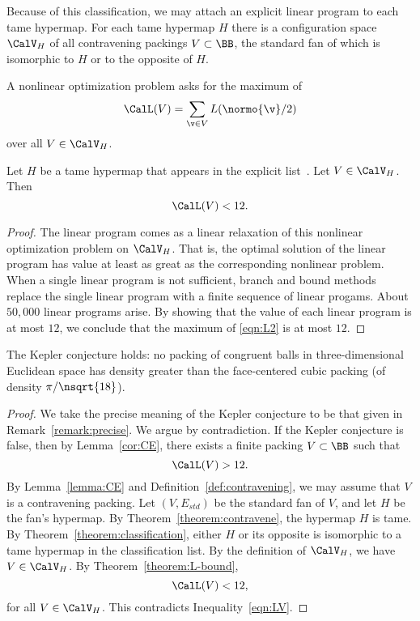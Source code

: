 Because of this classification, we may attach an explicit linear
program to each tame hypermap.  For each tame hypermap $H$ there is a
configuration space $\CalV_H$ of all contravening packings $V\subset
\BB$, the standard fan of which is isomorphic to $H$ or to the
opposite of $H$.  
%
%

A nonlinear optimization problem asks for the maximum of
\begin{equation}\label{eqn:L2}
\CalL(V)=\sum_{\v\in V} L(\normo{\v}/2)
\end{equation}
over all $V\in \CalV_H$.

\begin{theorem}\label{theorem:L-bound}  
Let $H$ be a tame hypermap that appears in the
explicit list~\cite{website:FlyspeckProject}.  Let $V\in \CalV_H$.  Then
\[
\CalL(V) < 12.
\]
\end{theorem}
%

\begin{proof}
  The linear program comes as a linear relaxation of this nonlinear
  optimization problem on $\CalV_H$. That is, the optimal solution of
  the linear program has value at least as great as the corresponding
  nonlinear problem.  When a single linear program is not sufficient,
  branch and bound methods replace the single linear program with a
  finite sequence of linear progams.  About $50,000$ linear
  programs arise.  By showing that the value of each linear program is
  at most $12$, we conclude that the maximum of \eqref{eqn:L2} is at
  most $12$.
\end{proof}

\begin{theorem}  The Kepler conjecture holds: no packing of congruent
balls in three-dimensional Euclidean space
 has density greater than the face-centered cubic packing (of
density $\pi/\nsqrt{18}$).
\end{theorem}
%

\begin{proof} We take the precise meaning of the Kepler conjecture to
  be that given in Remark~\ref{remark:precise}.  We argue by
  contradiction.  If the Kepler conjecture is false, then by
  Lemma~\ref{cor:CE}, there exists a finite packing
  $V\subset\BB$ such that
\begin{equation}\label{eqn:LV}
\CalL(V) > 12.
\end{equation}
By Lemma~\ref{lemma:CE} and Definition~\ref{def:contravening}, we may
assume that $V$ is a contravening packing.  Let $(V,E_{std})$ be the
standard fan of $V$, and let $H$ be the fan's hypermap.  By
Theorem~\ref{theorem:contravene}, the hypermap $H$ is tame.  By
Theorem~\ref{theorem:classification}, either $H$ or its opposite is
isomorphic to a tame hypermap in the classification list.  By the
definition of $\CalV_H$, we have $V\in \CalV_H$.  By
Theorem~\ref{theorem:L-bound},
\begin{equation}\label{eqn:done-L12}
\CalL(V) < 12,
\end{equation}
for all $V\in \CalV_H$.
This contradicts Inequality~\ref{eqn:LV}.
\end{proof}